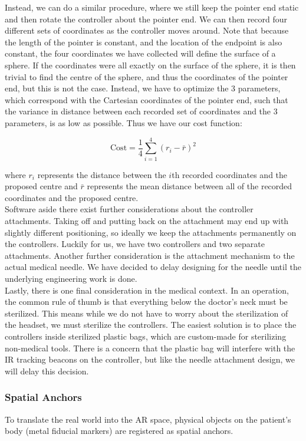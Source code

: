 \documentclass[12pt]{article}
\begin{document}
Instead, we can do a similar procedure, where we still keep the pointer end static and then rotate the controller about the pointer end. We can then record four different sets of coordinates as the controller moves around. Note that because the length of the pointer is constant, and the location of the endpoint is also constant, the four coordinates we have collected will define the surface of a sphere. If the coordinates were all exactly on the surface of the sphere, it is then trivial to find the centre of the sphere, and thus the coordinates of the pointer end, but this is not the case. Instead, we have to optimize the 3 parameters, which correspond with the Cartesian coordinates of the pointer end, such that the variance in distance between each recorded set of coordinates and the 3 parameters, is as low as possible. Thus we have our cost function:

$$\text{Cost} = \frac{1}{4}\sum^{4}_{i=1}(r_i - \bar{r})^2$$

where $r_i$ represents the distance between the $i$th recorded coordinates and the proposed centre and $\bar{r}$ represents the mean distance between all of the recorded coordinates and the proposed centre.\\

Software aside there exist further considerations about the controller attachments. Taking off and putting back on the attachment may end up with slightly different positioning, so ideally we keep the attachments permanently on the controllers. Luckily for us, we have two controllers and two separate attachments. Another further consideration is the attachment mechanism to the actual medical needle. We have decided to delay designing for the needle until the underlying engineering work is done.\\

Lastly, there is one final consideration in the medical context. In an operation, the common rule of thumb is that everything below the doctor's neck must be sterilized. This means while we do not have to worry about the sterilization of the headset, we must sterilize the controllers. The easiest solution is to place the controllers inside sterilized plastic bags, which are custom-made for sterilizing non-medical tools. There is a concern that the plastic bag will interfere with the IR tracking beacons on the controller, but like the needle attachment design, we will delay this decision.

\subsubsection{Spatial Anchors}
\label{spa:Spatial Anchors}
To translate the real world into the AR space, physical objects on the patient's body (metal fiducial markers) are registered as spatial anchors.\\
\end{document}

